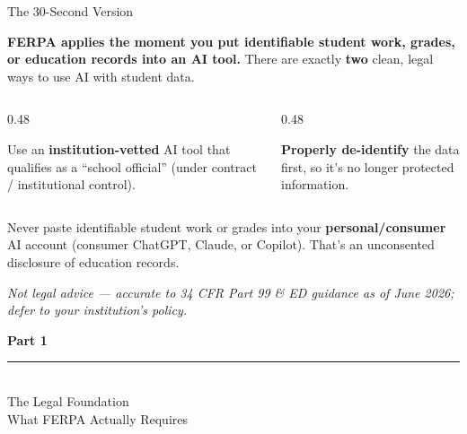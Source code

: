 \documentclass[aspectratio=169, 10pt]{beamer}
\newcommand{\cmcite}[1]{{\scriptsize\color{CoolGray}\textit{#1}}}
\begin{document}
\begin{frame}{The 30-Second Version}
\begin{tcolorbox}[accentbox, top=2pt, bottom=2pt]
\small
\textbf{FERPA applies the moment you put identifiable student work, grades, or education records into an AI tool.} There are exactly \textbf{two} clean, legal ways to use AI with student data.
\end{tcolorbox}
\vskip2pt
\begin{columns}[T]
\begin{column}{0.48\textwidth}
\begin{tcolorbox}[dobox, title={\faCheck\quad Path 1: Approved tool}, top=2pt, bottom=2pt]
\small Use an \textbf{institution-vetted} AI tool that qualifies as a ``school official'' (under contract / institutional control).
\end{tcolorbox}
\end{column}
\begin{column}{0.48\textwidth}
\begin{tcolorbox}[dobox, title={\faCheck\quad Path 2: De-identify}, top=2pt, bottom=2pt]
\small \textbf{Properly de-identify} the data first, so it's no longer protected information.
\end{tcolorbox}
\end{column}
\end{columns}
\vskip4pt
\begin{tcolorbox}[dontbox, title={\faBan\quad The one-line don't}, top=2pt, bottom=2pt]
\small Never paste identifiable student work or grades into your \textbf{personal/consumer} AI account (consumer ChatGPT, Claude, or Copilot). That's an unconsented disclosure of education records.
\end{tcolorbox}
\vskip1pt
\cmcite{Not legal advice --- accurate to 34 CFR Part 99 \& ED guidance as of June 2026; defer to your institution's policy.}
\end{frame}

{
\begin{frame}
\centering\vfill
{\fontsize{22}{28}\bfseries\selectfont\color{white} Part 1}\\[6pt]
{\color{UVMGold}\rule{5cm}{0.8pt}}\\[6pt]
{\normalsize\color{UVMGold} The Legal Foundation}\\[4pt]
{\small\color{PaleSage} What FERPA Actually Requires}
\vfill
\end{frame}
}
\end{document}
